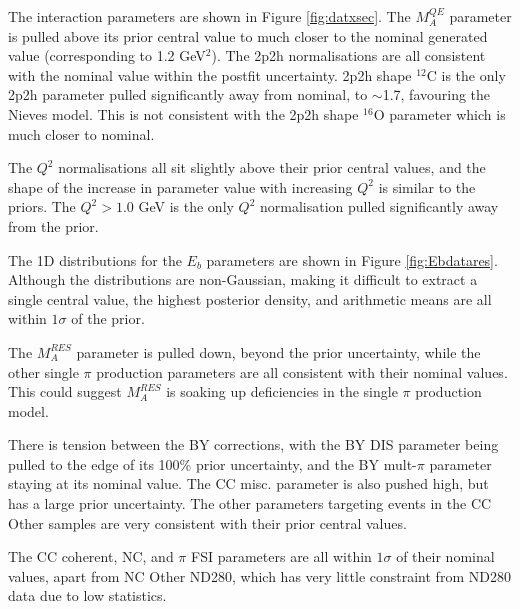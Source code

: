 The interaction parameters are shown in Figure \ref{fig:datxsec}. The $M^{QE}_A$ parameter is pulled above its prior central value to much closer to the nominal generated value (corresponding to 1.2 GeV$^2$). The 2p2h normalisations are all consistent with the nominal value within the postfit uncertainty. 2p2h shape $^{12}$C is the only 2p2h parameter pulled significantly away from nominal, to $\sim$1.7, favouring the Nieves model. This is not consistent with the 2p2h shape $^{16}$O parameter which is much closer to nominal.

The $Q^2$ normalisations all sit slightly above their prior central values, and the shape of the increase in parameter value with increasing $Q^2$ is similar to the priors. The $Q^2>1.0$ GeV is the only $Q^2$ normalisation pulled significantly away from the prior.

The 1D distributions for the $E_b$ parameters are shown in Figure \ref{fig:Ebdatares}. Although the distributions are non-Gaussian, making it difficult to extract a single central value, the highest posterior density, and arithmetic means are all within $1\sigma$ of the prior.

The $M_A^{RES}$ parameter is pulled down, beyond the prior uncertainty, while the other single $\pi$ production parameters are all consistent with their nominal values. This could suggest $M_A^{RES}$ is soaking up deficiencies in the single $\pi$ production model.

There is tension between the BY corrections, with the BY DIS parameter being pulled to the edge of its 100$\%$ prior uncertainty, and the BY mult-$\pi$ parameter staying at its nominal value. The CC misc. parameter is also pushed high, but has a large prior uncertainty. The other parameters targeting events in the CC Other samples are very consistent with their prior central values. 

The CC coherent, NC, and $\pi$ FSI parameters are all within $1\sigma$ of their nominal values, apart from NC Other ND280, which has very little constraint from ND280 data due to low statistics. 

